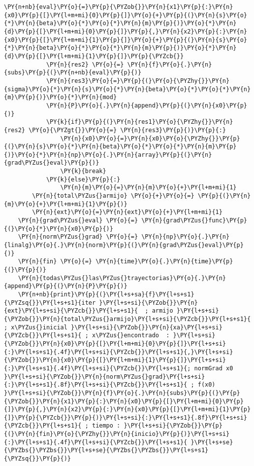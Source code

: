 \begin{itemize}
\begin{tcolorbox}[breakable, size=fbox, boxrule=1pt, pad at break*=1mm,colback=cellbackground, colframe=cellborder]
\begin{Verbatim}[commandchars=\\\{\}]
            \PY{n+nb}{eval}\PY{o}{=}\PY{p}{\PYZob{}}\PY{n}{x1}\PY{p}{:}\PY{n}{x0}\PY{p}{[}\PY{l+m+mi}{0}\PY{p}{]}\PY{o}{+}\PY{p}{(}\PY{n}{s}\PY{o}{*}\PY{n}{beta}\PY{o}{*}\PY{o}{*}\PY{n}{m}\PY{p}{)}\PY{o}{*}\PY{n}{d}\PY{p}{[}\PY{l+m+mi}{0}\PY{p}{]}\PY{p}{,}\PY{n}{x2}\PY{p}{:}\PY{n}{x0}\PY{p}{[}\PY{l+m+mi}{1}\PY{p}{]}\PY{o}{+}\PY{p}{(}\PY{n}{s}\PY{o}{*}\PY{n}{beta}\PY{o}{*}\PY{o}{*}\PY{n}{m}\PY{p}{)}\PY{o}{*}\PY{n}{d}\PY{p}{[}\PY{l+m+mi}{1}\PY{p}{]}\PY{p}{\PYZcb{}}
            \PY{n}{res2} \PY{o}{=} \PY{n}{f}\PY{o}{.}\PY{n}{subs}\PY{p}{(}\PY{n+nb}{eval}\PY{p}{)}    
            \PY{n}{res3}\PY{o}{=}\PY{p}{(}\PY{o}{\PYZhy{}}\PY{n}{sigma}\PY{o}{*}\PY{n}{s}\PY{o}{*}\PY{n}{beta}\PY{o}{*}\PY{o}{*}\PY{n}{m}\PY{p}{)}\PY{o}{*}\PY{n}{mod}
            \PY{n}{P}\PY{o}{.}\PY{n}{append}\PY{p}{(}\PY{n}{x0}\PY{p}{)}
            \PY{k}{if}\PY{p}{(}\PY{n}{res1}\PY{o}{\PYZhy{}}\PY{n}{res2} \PY{o}{\PYZgt{}}\PY{o}{=} \PY{n}{res3}\PY{p}{)}\PY{p}{:}
                \PY{n}{x0}\PY{o}{=}\PY{n}{x0}\PY{o}{\PYZhy{}}\PY{p}{(}\PY{n}{s}\PY{o}{*}\PY{n}{beta}\PY{o}{*}\PY{o}{*}\PY{n}{m}\PY{p}{)}\PY{o}{*}\PY{n}{np}\PY{o}{.}\PY{n}{array}\PY{p}{(}\PY{n}{grad\PYZus{}eval}\PY{p}{)}
                \PY{k}{break}
            \PY{k}{else}\PY{p}{:}
                \PY{n}{m}\PY{o}{=}\PY{n}{m}\PY{o}{+}\PY{l+m+mi}{1}
        \PY{n}{total\PYZus{}armijo} \PY{o}{+}\PY{o}{=} \PY{p}{(}\PY{n}{m}\PY{o}{+}\PY{l+m+mi}{1}\PY{p}{)}
        \PY{n}{ext}\PY{o}{=}\PY{n}{ext}\PY{o}{+}\PY{l+m+mi}{1}
    \PY{n}{grad\PYZus{}eval} \PY{o}{=} \PY{n}{grad\PYZus{}func}\PY{p}{(}\PY{o}{*}\PY{n}{x0}\PY{p}{)}
    \PY{n}{norm\PYZus{}grad} \PY{o}{=} \PY{n}{np}\PY{o}{.}\PY{n}{linalg}\PY{o}{.}\PY{n}{norm}\PY{p}{(}\PY{n}{grad\PYZus{}eval}\PY{p}{)}
    \PY{n}{fin} \PY{o}{=} \PY{n}{time}\PY{o}{.}\PY{n}{time}\PY{p}{(}\PY{p}{)}
    \PY{n}{todas\PYZus{}las\PYZus{}trayectorias}\PY{o}{.}\PY{n}{append}\PY{p}{(}\PY{n}{P}\PY{p}{)}
    \PY{n+nb}{print}\PY{p}{(}\PY{l+s+sa}{f}\PY{l+s+s1}{\PYZsq{}}\PY{l+s+s1}{iter }\PY{l+s+si}{\PYZob{}}\PY{n}{ext}\PY{l+s+si}{\PYZcb{}}\PY{l+s+s1}{  ; armijo }\PY{l+s+si}{\PYZob{}}\PY{n}{total\PYZus{}armijo}\PY{l+s+si}{\PYZcb{}}\PY{l+s+s1}{ ; x\PYZus{}inicial }\PY{l+s+si}{\PYZob{}}\PY{n}{xa}\PY{l+s+si}{\PYZcb{}}\PY{l+s+s1}{ ; x\PYZus{}encontrado  : }\PY{l+s+si}{\PYZob{}}\PY{n}{x0}\PY{p}{[}\PY{l+m+mi}{0}\PY{p}{]}\PY{l+s+si}{:}\PY{l+s+s1}{.4f}\PY{l+s+si}{\PYZcb{}}\PY{l+s+s1}{,}\PY{l+s+si}{\PYZob{}}\PY{n}{x0}\PY{p}{[}\PY{l+m+mi}{1}\PY{p}{]}\PY{l+s+si}{:}\PY{l+s+s1}{.4f}\PY{l+s+si}{\PYZcb{}}\PY{l+s+s1}{; normGrad x0  }\PY{l+s+si}{\PYZob{}}\PY{n}{norm\PYZus{}grad}\PY{l+s+si}{:}\PY{l+s+s1}{.8f}\PY{l+s+si}{\PYZcb{}}\PY{l+s+s1}{ ; f(x0) }\PY{l+s+si}{\PYZob{}}\PY{n}{f}\PY{o}{.}\PY{n}{subs}\PY{p}{(}\PY{p}{\PYZob{}}\PY{n}{x1}\PY{p}{:}\PY{n}{x0}\PY{p}{[}\PY{l+m+mi}{0}\PY{p}{]}\PY{p}{,}\PY{n}{x2}\PY{p}{:}\PY{n}{x0}\PY{p}{[}\PY{l+m+mi}{1}\PY{p}{]}\PY{p}{\PYZcb{}}\PY{p}{)}\PY{l+s+si}{:}\PY{l+s+s1}{.8f}\PY{l+s+si}{\PYZcb{}}\PY{l+s+s1}{ ; tiempo : }\PY{l+s+si}{\PYZob{}}\PY{p}{(}\PY{n}{fin}\PY{o}{\PYZhy{}}\PY{n}{inicio}\PY{p}{)}\PY{l+s+si}{:}\PY{l+s+s1}{.4f}\PY{l+s+si}{\PYZcb{}}\PY{l+s+s1}{ }\PY{l+s+se}{\PYZbs{}\PYZbs{}}\PY{l+s+se}{\PYZbs{}\PYZbs{}}\PY{l+s+s1}{\PYZsq{}}\PY{p}{)}

\end{Verbatim}
\end{tcolorbox}
\end{itemize}
